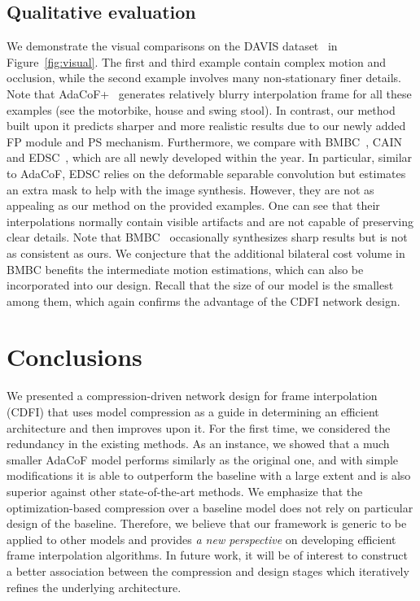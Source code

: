 \documentclass[final]{cvpr}
\begin{document}
\vspace{-.01in}
\subsection{Qualitative evaluation}
\vspace{-.01in}

We demonstrate the visual comparisons on the DAVIS dataset~\cite{perazzi2016} in Figure~\ref{fig:visual}. The first and third example contain complex motion and occlusion, 
while the second example involves many non-stationary finer details. Note that AdaCoF+~\cite{lee2020adacof} generates relatively blurry interpolation frame for all these examples (see the motorbike, house and swing stool). In contrast, our method built upon it predicts sharper and more realistic results due to our newly added FP module and PS mechanism. Furthermore, we compare with BMBC~\cite{park2020bmbc}, CAIN~\cite{choi2020channel} and EDSC~\cite{cheng2020multiple}, which are all newly developed within the year. In particular, similar to AdaCoF, EDSC relies on the deformable separable convolution but estimates an extra mask to help with the image synthesis. However, they are not as appealing as our method on the provided examples. One can see that their interpolations normally contain visible artifacts and are not capable of preserving clear details. Note that BMBC~\cite{park2020bmbc} occasionally synthesizes sharp results but is not as consistent as ours. We conjecture that the additional bilateral cost volume in BMBC benefits the intermediate motion estimations, which can also be incorporated into our design. Recall that the size of our model is the smallest among them, which again confirms the advantage of the CDFI network design.

\vspace{-.01in}
\section{Conclusions}
\vspace{-.01in}

We presented a compression-driven network design for frame interpolation (CDFI) that uses model compression as a guide in determining an efficient architecture and then improves upon it. For the first time, we considered the redundancy in the existing methods. As an instance, we showed that a much smaller AdaCoF model performs similarly as the original one, and with simple modifications it is able to outperform the baseline with a large extent and is also superior against other state-of-the-art methods. We emphasize that the optimization-based compression over a baseline model does not rely on particular design of the baseline. Therefore, we believe that our framework is generic to be applied to other models and provides \emph{a new perspective} on developing efficient frame interpolation algorithms. In future work, it will be of interest to construct a better association between the compression and design stages which iteratively refines the underlying architecture.



\newpage

{\small



\nocite{reda2019unsupervised}
\nocite{choi2020scene}
\nocite{son2020aim}
}
\end{document}
